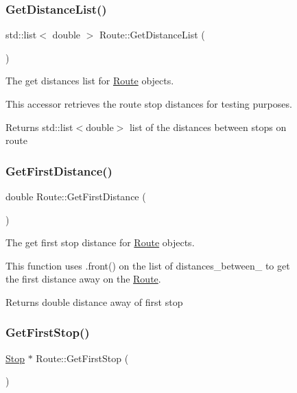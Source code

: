 \begin{figure}[H]
\begin{center}
\subsubsection{\texorpdfstring{Get\+Distance\+List()}{GetDistanceList()}}
{\footnotesize\ttfamily std\+::list$<$ double $>$ Route\+::\+Get\+Distance\+List (\begin{DoxyParamCaption}{ }\end{DoxyParamCaption})}



The get distances list for \hyperlink{classRoute}{Route} objects. 

This accessor retrieves the route stop distances for testing purposes.

\begin{DoxyReturn}{Returns}
std\+::list$<$double$>$ list of the distances between stops on route 
\end{DoxyReturn}
\mbox{\label{classRoute_a352a82a718bfdec044b114abe332c29f}} 
\subsubsection{\texorpdfstring{Get\+First\+Distance()}{GetFirstDistance()}}
{\footnotesize\ttfamily double Route\+::\+Get\+First\+Distance (\begin{DoxyParamCaption}{ }\end{DoxyParamCaption})}



The get first stop distance for \hyperlink{classRoute}{Route} objects. 

This function uses .front() on the list of distances\+\_\+between\+\_\+ to get the first distance away on the \hyperlink{classRoute}{Route}.

\begin{DoxyReturn}{Returns}
double distance away of first stop 
\end{DoxyReturn}
\mbox{\label{classRoute_aa70ac0596b72df43514f6e3a81552d38}} 
\subsubsection{\texorpdfstring{Get\+First\+Stop()}{GetFirstStop()}}
{\footnotesize\ttfamily \hyperlink{classStop}{Stop} $\ast$ Route\+::\+Get\+First\+Stop (\begin{DoxyParamCaption}{ }\end{DoxyParamCaption})}




\end{center}
\end{figure}
